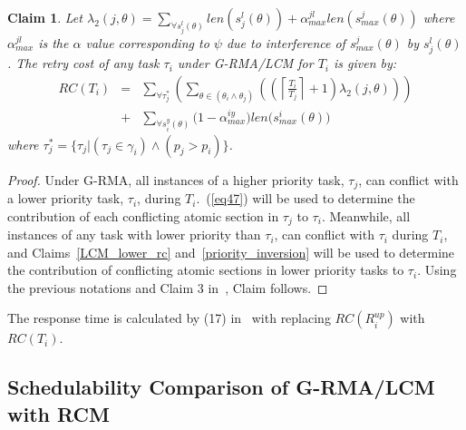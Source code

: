 \documentclass[conference]{IEEEtran}
\newtheorem{clm}{Claim}
\begin{document}
\begin{clm}\label{response g-rma/lcm}
Let $\lambda_{2}(j,\theta)=\sum_{\forall s_{j}^{l}(\theta)}len(s_{j}^{l}(\theta))+\alpha_{max}^{jl}len(s_{max}^{j}(\theta))$ where $\alpha_{max}^{jl}$ is the $\alpha$ value corresponding to $\psi$ due to interference of $s_{max}^j(\theta)$ by $s_j^l(\theta)$. The retry cost of any task $\tau_i$ under G-RMA/LCM for $T_i$ is given by:
\begin{eqnarray}
RC\left(T_i\right) & = &
  \sum_{\forall \tau_{j}^{*}}\left(\sum_{\theta\in(\theta_{i}\wedge\theta_{j})}\left(\left(\left\lceil\frac{T_i}{T_{j}}\right\rceil +1\right)\lambda_{2}(j,\theta)\right)\right)\nonumber\\
& + & \sum_{\forall s_{i}^{y}(\theta)}\Big(1-\alpha_{max}^{iy}\Big)len\Big(s_{max}^i(\theta)\Big)
\label{eq60}
\end{eqnarray}
where $\tau_{j}^{*}=\{\tau_{j}|(\tau_{j}\in\gamma_{i})\wedge(p_{j}>p_{i})\}$.
\end{clm}
\begin{proof}
Under G-RMA, all instances of a higher priority task, $\tau_{j}$, can conflict with a lower priority task,
$\tau_{i}$, during $T_{i}$.~(\ref{eq47}) will be used to determine the contribution of each conflicting atomic section in $\tau_j$ to $\tau_i$. Meanwhile, all instances of any task with lower priority than $\tau_{i}$, can conflict with $\tau_i$ during $T_{i}$, and Claims~\ref{LCM_lower_rc} and~\ref{priority_inversion} will be used to determine the contribution of conflicting atomic sections in lower priority tasks to $\tau_i$.
%
Using the previous notations and Claim 3 in~\cite{stmconcurrencycontrol:emsoft11}, Claim follows.
\end{proof}

The response time is calculated by (17) in~\cite{stmconcurrencycontrol:emsoft11} with replacing $RC(R_i^{up})$ with $RC(T_i)$.

\subsection{Schedulability Comparison of G-RMA/LCM with RCM}
\label{rma eval}
\end{document}
